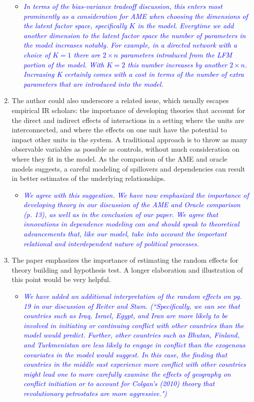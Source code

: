 \begin{enumerate}
\begin{itemize}
		\item \textcolor{blue}{ \emph{
			In terms of the bias-variance tradeoff discussion, this enters most prominently as a consideration for AME when choosing the dimensions of the latent factor space, specifically $K$ in the model. Everytime we add another dimension to the latent factor space the number of parameters in the model increases notably. For example, in a directed network with a choice of $K=1$ there are $2 \times n$ parameters introduced from the LFM portion of the model. With $K=2$ this number increases by another $2 \times n$. Increasing K certainly comes with a cost in terms of the number of extra parameters that are introduced into the model.
		}}
	\end{itemize}
	\item The author could also underscore a related issue, which usually escapes empirical IR scholars: the importance of developing theories that account for the direct and indirect effects of interactions in a setting where the units are interconnected, and where the effects on one unit have the potential to impact other units in the system. A traditional approach is to throw as many observable variables as possible as controls, without much consideration on where they fit in the model. As the comparison of the AME and oracle models suggests, a careful modeling of spillovers and dependencies can result in better estimates of the underlying relationships.
	\begin{itemize}
		\item \textcolor{blue}{ \emph{
		We agree with this suggestion. We have now emphasized the importance of developing theory in our discussion of the AME and Oracle comparison (p. 13), as well as in the conclusion of our paper. We agree that innovations in dependence modeling can and should speak to theoretical advancements that, like our model, take into account the important relational and interdependent nature of political processes.
		}}
	\end{itemize}
	\item The paper emphasizes the importance of estimating the random effects for theory building and hypothesis test. A longer elaboration and illustration of this point would be very helpful.
	\begin{itemize}
		\item \textcolor{blue}{ \emph{
		We have added an additional interpretation of the random effects on pg. 19 in our discussion of Reiter and Stam. (``Specifically, we can see that countries such as Iraq, Israel, Egypt, and Iran are more likely to be involved in initiating or continuing conflict with other countries than the model would predict. Further, other countries such as Bhutan, Finland, and Turkmenistan are less likely to engage in conflict than the exogenous covariates in the model would suggest. In this case, the finding that countries in the middle east experience more conflict with other countries might lead one to more carefully examine the effects of geography on conflict initiation or to account for Colgan's (2010) theory that revolutionary petrostates are more aggressive.")
}}
\end{itemize}
\end{enumerate}
